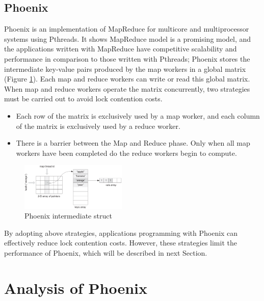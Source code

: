 \subsection{Phoenix}
Phoenix is an implementation of MapReduce for multicore  and multiprocessor systems using Pthreads.
It shows MapReduce model is a promising model, and the applications written with MapReduce have competitive scalability and performance in comparison to those written with Pthreads\cite{ranger2007phoenix};
Phoenix stores the intermediate key-value pairs produced 
by the map workers in a global matrix (Figure \ref{fig:phoenix:intermediate}). 
Each map and reduce workers can write or read this global matrix. 
When map and reduce workers operate the matrix concurrently,
two strategies must be carried out to avoid lock contention costs.
\begin{itemize}
	\item Each row of the matrix is exclusively used by a map worker, and each column of the matrix is exclusively used by a reduce worker. 
	\item There is a barrier between the Map and Reduce phase. Only when all map workers have been completed do the reduce workers begin to compute. 
\end{itemize}

\begin{figure}[!h!t]  
    \centering
    \includegraphics[width=0.45\textwidth]{eps/phoenix_intermediate.eps}
    \caption{Phoenix intermediate struct}
    \label{fig:phoenix:intermediate}
\end{figure}

By adopting above strategies, applications programming with Phoenix can effectively reduce lock contention costs. 
However, these strategies limit the performance of Phoenix, which will be described in next Section. 

\section{Analysis of Phoenix}

